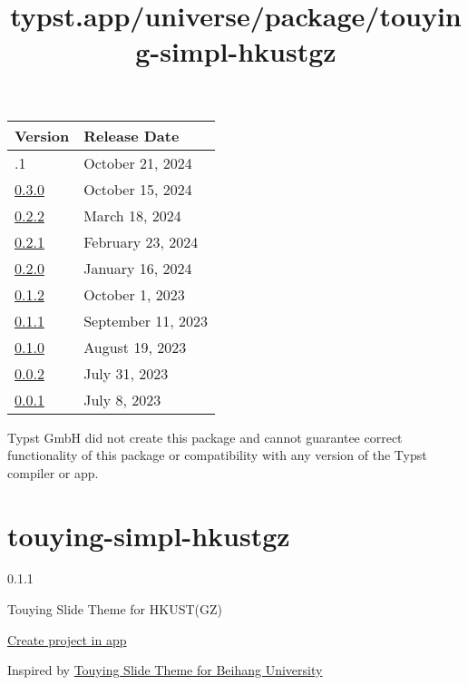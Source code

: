 \begin{longtable}[]{@{}ll@{}}
\toprule\noalign{}
Version & Release Date \\
\midrule\noalign{}
\endhead
\bottomrule\noalign{}
\endlastfoot
0.3.1 & October 21, 2024 \\
\href{https://typst.app/universe/package/cetz/0.3.0/}{0.3.0} & October
15, 2024 \\
\href{https://typst.app/universe/package/cetz/0.2.2/}{0.2.2} & March 18,
2024 \\
\href{https://typst.app/universe/package/cetz/0.2.1/}{0.2.1} & February
23, 2024 \\
\href{https://typst.app/universe/package/cetz/0.2.0/}{0.2.0} & January
16, 2024 \\
\href{https://typst.app/universe/package/cetz/0.1.2/}{0.1.2} & October
1, 2023 \\
\href{https://typst.app/universe/package/cetz/0.1.1/}{0.1.1} & September
11, 2023 \\
\href{https://typst.app/universe/package/cetz/0.1.0/}{0.1.0} & August
19, 2023 \\
\href{https://typst.app/universe/package/cetz/0.0.2/}{0.0.2} & July 31,
2023 \\
\href{https://typst.app/universe/package/cetz/0.0.1/}{0.0.1} & July 8,
2023 \\
\end{longtable}

Typst GmbH did not create this package and cannot guarantee correct
functionality of this package or compatibility with any version of the
Typst compiler or app.


\title{typst.app/universe/package/touying-simpl-hkustgz}

\label{banner}
\label{template-thumbnail}

\section{touying-simpl-hkustgz}\label{touying-simpl-hkustgz}

{ 0.1.1 }

Touying Slide Theme for HKUST(GZ)

\href{/app?template=touying-simpl-hkustgz&version=0.1.1}{Create project
in app}

\label{readme}
Inspired by \href{https://github.com/Coekjan/touying-buaa}{Touying Slide
Theme for Beihang University}

